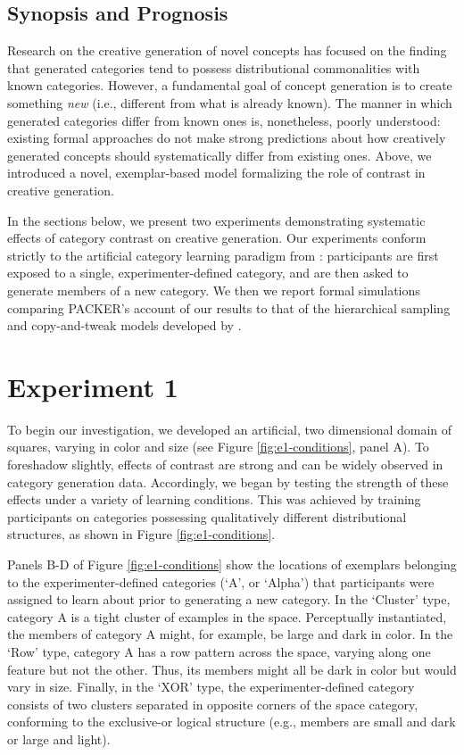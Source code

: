 \documentclass[12pt]{article}
\begin{document}
\begin{flushleft}
\subsection{Synopsis and Prognosis}

Research on the creative generation of novel concepts has focused on the finding that generated categories tend to possess distributional commonalities with known categories. However, a fundamental goal of concept generation is to create something \textit{new} (i.e., different from what is already known). The manner in which generated categories differ from known ones is, nonetheless, poorly understood: existing formal approaches do not make strong predictions about how creatively generated concepts should systematically differ from existing ones. Above, we introduced a novel, exemplar-based model formalizing the role of contrast in creative generation.

In the sections below, we present two experiments demonstrating systematic effects of category contrast on creative generation. Our experiments conform strictly to the artificial category learning paradigm from \cite{jern2013probabilistic}: participants are first exposed to a single, experimenter-defined category, and are then asked to generate members of a new category. We then we report formal simulations comparing PACKER's account of our results to that of the hierarchical sampling and copy-and-tweak models developed by \cite{jern2013probabilistic}.


\section{Experiment 1}

To begin our investigation, we developed an artificial, two dimensional domain of squares, varying in color and size (see Figure \ref{fig:e1-conditions}, panel A). To foreshadow slightly, effects of contrast are strong and can be widely observed in category generation data. Accordingly, we began by testing the strength of these effects under a variety of learning conditions. This was achieved by training participants on categories possessing qualitatively different distributional structures, as shown in Figure \ref{fig:e1-conditions}. 

Panels B-D of Figure \ref{fig:e1-conditions} show the locations of exemplars belonging to the experimenter-defined categories (`A', or `Alpha') that participants were assigned to learn about prior to generating a new category. In the `Cluster' type, category A is a tight cluster of examples in the space. Perceptually instantiated, the members of category A might, for example, be large and dark in color. In the `Row' type, category A has a row pattern across the space, varying along one feature but not the other. Thus, its members might all be dark in color but would vary in size. Finally, in the `XOR' type, the experimenter-defined category consists of two clusters separated in opposite corners of the space category, conforming to the exclusive-or logical structure (e.g., members are small and dark or large and light). 


\end{flushleft}
\end{document}
